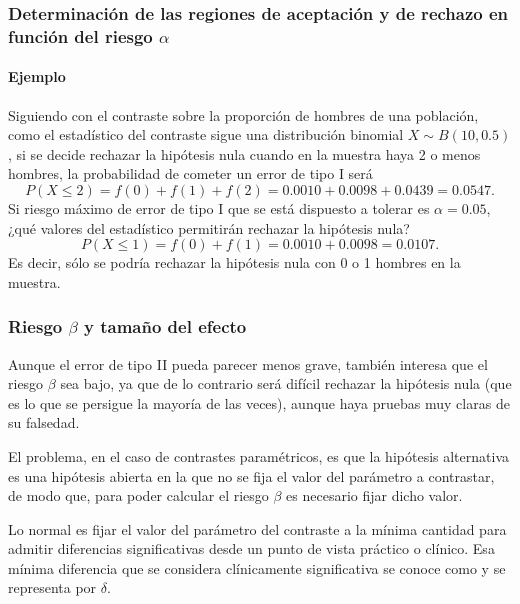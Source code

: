 \begin{frame}
\frametitle{Determinación de las regiones de aceptación y de rechazo en función del riesgo $\alpha$}
\framesubtitle{Ejemplo}
Siguiendo con el contraste sobre la proporción de hombres de una población, como el estadístico del contraste sigue una distribución binomial $X\sim B(10,0.5)$, si se decide rechazar la hipótesis nula cuando en la muestra haya 2 o menos hombres, la probabilidad de cometer un error de tipo I será
\[
P(X\leq 2)= f(0)+f(1)+f(2)= 0.0010 + 0.0098 + 0.0439 = 0.0547.
\]
Si riesgo máximo de error de tipo I que se está dispuesto a tolerar es $\alpha=0.05$, ¿qué valores del estadístico permitirán rechazar la hipótesis nula?
\[
P(X\leq 1)= f(0)+f(1) = 0.0010 + 0.0098 = 0.0107.
\]
Es decir, sólo se podría rechazar la hipótesis nula con 0 o 1 hombres en la muestra.

\begin{center}
\end{center}
 \end{frame}


\begin{frame}
\frametitle{Riesgo $\beta$ y tamaño del efecto}
Aunque el error de tipo II pueda parecer menos grave, también interesa que el riesgo $\beta$ sea bajo, ya que de lo contrario será difícil rechazar la hipótesis nula (que es lo que se persigue la mayoría de las veces), aunque haya pruebas muy claras de su falsedad.

El problema, en el caso de contrastes paramétricos, es que la hipótesis alternativa es una hipótesis abierta en la que no se fija el valor del parámetro a contrastar, de modo que, para poder calcular el riesgo $\beta$ es necesario fijar dicho valor.

Lo normal es fijar el valor del parámetro del contraste a la mínima cantidad para admitir diferencias significativas desde un punto de vista práctico o clínico.
Esa mínima diferencia que se considera clínicamente significativa se conoce como  y se representa por $\delta$.
\end{frame}


